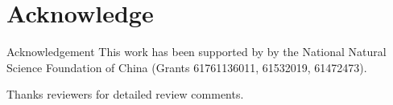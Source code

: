 \vspace{-1.2em}
\section{Acknowledge}
\vspace{-1em}

Acknowledgement
This work has been supported by by the National Natural Science Foundation of
China (Grants 61761136011, 61532019, 61472473).

Thanks reviewers for detailed review comments.